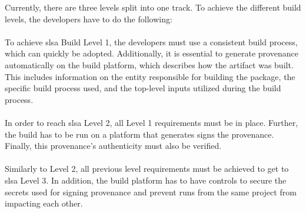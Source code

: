 Currently, there are three levels split into one track. To achieve the different build levels, the developers have to do the following:
\\~\\
To achieve \acrshort{slsa} Build Level 1, the developers must use a consistent build process, which can quickly be adopted. Additionally, it is essential to generate \gls{provenance} automatically on the build platform, which describes how the artifact was built. This includes information on the entity responsible for building the package, the specific build process used, and the top-level inputs utilized during the build process.
\\~\\
In order to reach \acrshort{slsa} Level 2, all Level 1 requirements must be in place. Further, the build has to be run on a platform that generates signs the \gls{provenance}. Finally, this \gls{provenance}'s authenticity must also be verified.
\\~\\
Similarly to Level 2, all previous level requirements must be achieved to get to \acrshort{slsa} Level 3. In addition, the build platform has to have controls to secure the secrets used for signing \gls{provenance} and prevent runs from the same project from impacting each other. 


